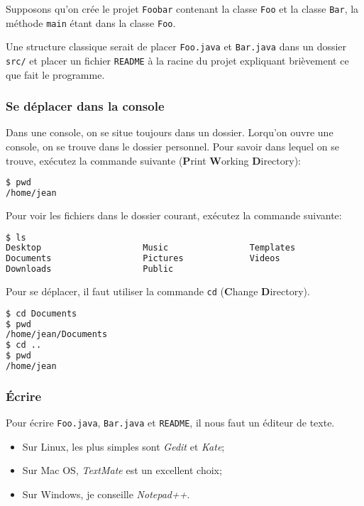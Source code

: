 Supposons qu'on crée le projet \lstinline|Foobar| contenant la classe
\lstinline|Foo| et la classe \lstinline|Bar|,
la méthode \lstinline|main| étant dans la classe \lstinline|Foo|.

Une structure classique serait de placer
\lstinline|Foo.java| et \lstinline|Bar.java|
dans un dossier \lstinline|src/| et placer un fichier \lstinline|README|
à la racine du projet expliquant brièvement ce que fait le programme.

\subsubsection{Se déplacer dans la console}
Dans une console, on se situe toujours dans un dossier.
Lorqu'on ouvre une console, on se trouve dans le dossier personnel.
Pour savoir dans lequel on se trouve,
exécutez la commande suivante
(\textbf{P}rint \textbf{W}orking \textbf{D}irectory):
\begin{lstlisting}[language={sh}]
$ pwd
/home/jean
\end{lstlisting}

Pour voir les fichiers dans le dossier courant, exécutez la commande suivante:
\begin{lstlisting}[language={sh}, morekeywords={ls}]
$ ls
Desktop                    Music                Templates
Documents                  Pictures             Videos
Downloads                  Public
\end{lstlisting}

Pour se déplacer, il faut utiliser la commande
\lstinline|cd| (\textbf{C}hange \textbf{D}irectory).
\begin{lstlisting}[language={sh}, morekeywords={xx}]
$ cd Documents
$ pwd
/home/jean/Documents
$ cd ..
$ pwd
/home/jean
\end{lstlisting}

\subsubsection{Écrire}
Pour écrire \lstinline|Foo.java|, \lstinline|Bar.java| et \lstinline|README|,
il nous faut un éditeur de texte.

\begin{itemize}
  \item Sur Linux, les plus simples sont {\em Gedit} et {\em Kate};
  \item Sur Mac OS, {\em TextMate} est un excellent choix;
  \item Sur Windows, je conseille {\em Notepad++}.
\end{itemize}

